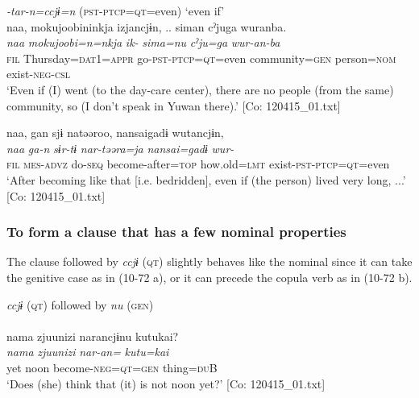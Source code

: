 \ea\label{ex:10.71}   \textit{{}-tar-n=ccjɨ=n} (\textsc{pst}-\textsc{ptcp}=\textsc{qt}=even) ‘even if’\\
  \ea  %
      \glll    naa,  {\textbar}mokujoobi{\textbar}ninkja  izjancjɨn, ..  siman  cˀjuga  wuranba.\\
      \textit{naa}  \textit{mokujoobi=n=nkja}  \textit{ik-}  \textit{sima=nu}  \textit{cˀju=ga}  \textit{wur-an-ba}\\
      \textsc{fil}  Thursday=\textsc{dat}1=\textsc{appr}  go-\textsc{pst}-\textsc{ptcp}=\textsc{qt}=even  community=\textsc{gen} person=\textsc{nom}  exist-\textsc{neg}-\textsc{csl}\\
      \glt       ‘Even if (I) went (to the day-care center), there are no people (from the same) community, so (I don’t speak in Yuwan there).’ [Co: 120415\_01.txt]

  \ex  %
      \glll    naa,  gan  sjɨ  natəəroo,  {\textbar}nansai{\textbar}gadɨ  wutancjɨn,\\
      \textit{naa}  \textit{ga-n}  \textit{sɨr-tɨ}  \textit{nar-təəra=ja}  \textit{nansai=gadɨ}  \textit{wur-}\\
      \textsc{fil}  \textsc{mes}-\textsc{advz}  do-\textsc{seq}  become-after=\textsc{top}  how.old=\textsc{lmt}   exist-\textsc{pst}-\textsc{ptcp}=\textsc{qt}=even\\
      \glt       ‘After becoming like that [i.e. bedridden], even if (the person) lived very long, ...’ [Co: 120415\_01.txt]
    \z
\z

\subsubsection{To form a clause that has a few nominal properties}\label{sec:10.4.1.5}

The clause followed by \textit{ccjɨ} (\textsc{qt}) slightly behaves like the nominal since it can take the genitive case as in (10-72 a), or it can precede the copula verb as in (10-72 b).

\ea\label{ex:10.72} 
\ea \textit{ccjɨ} (\textsc{qt}) followed by \textit{nu} (\textsc{gen})\\\\
      \glll    nama  {\textbar}zjuunizi{\textbar}  narancjɨnu  kutukai?\\
    \textit{nama}  \textit{zjuunizi}  \textit{nar-an=}  \textit{kutu=kai}\\
    yet  noon  become-\textsc{neg}=\textsc{qt}=\textsc{gen}  thing=\textsc{du}B\\
\glt     ‘Does (she) think that (it) is not noon yet?’  [Co: 120415\_01.txt]

